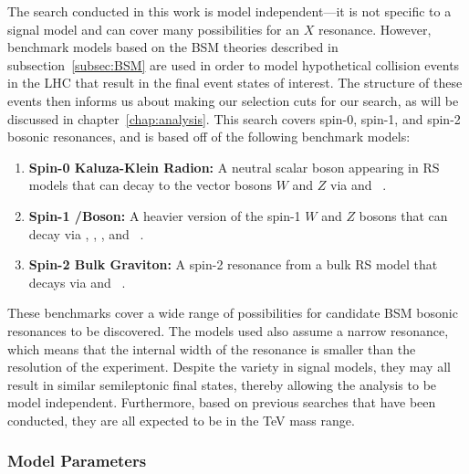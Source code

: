 The search conducted in this work is model independent---it is not specific to a signal model and can cover many possibilities for an $X$ resonance.
However, benchmark models based on the BSM theories described in subsection~\ref{subsec:BSM} are used in order to model hypothetical collision events in the LHC that result in the final event states of interest.
The structure of these events then informs us about making our selection cuts for our search, as will be discussed in chapter~\ref{chap:analysis}.
This search covers spin-0, spin-1, and spin-2 bosonic resonances, and is based off of the following benchmark models:
\begin{enumerate}
  \item \textbf{Spin-0 Kaluza-Klein Radion:} A neutral scalar boson appearing in RS models that can decay to the vector bosons $W$ and $Z$ via \RadtoWW and \RadtoZZ~\cite{Goldberger_1999,Goldberger_2000}.
  \item \textbf{Spin-1 \Wpr/\Zpr Boson:} A heavier version of the spin-1 $W$ and $Z$ bosons that can decay via \WprtoWZ, \WprtoWH, \ZprtoWW, and \ZprtoZH~\cite{Pappadopulo_2014}.
  \item \textbf{Spin-2 Bulk Graviton:} A spin-2 resonance from a bulk RS model that decays via \GBulktoWW and \GBulktoZZ~\cite{Fitzpatrick_2007,PhysRevD.76.036006}.
\end{enumerate}

These benchmarks cover a wide range of possibilities for candidate BSM bosonic resonances to be discovered.
The models used also assume a narrow resonance, which means that the internal width of the resonance is smaller than the resolution of the experiment.
Despite the variety in signal models, they may all result in similar semileptonic final states, thereby allowing the analysis to be model independent.
Furthermore, based on previous searches that have been conducted, they are all expected to be in the TeV mass range.

\subsubsection{Model Parameters}
\label{subsec:param}

